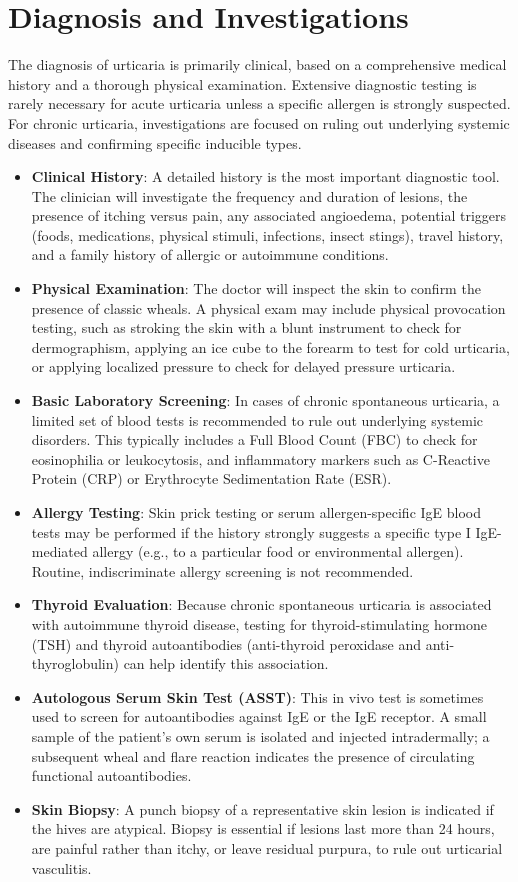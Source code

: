 \section*{Diagnosis and Investigations}
The diagnosis of urticaria is primarily clinical, based on a comprehensive medical history and a thorough physical examination. Extensive diagnostic testing is rarely necessary for acute urticaria unless a specific allergen is strongly suspected. For chronic urticaria, investigations are focused on ruling out underlying systemic diseases and confirming specific inducible types.

\begin{itemize}
    \item \textbf{Clinical History}: A detailed history is the most important diagnostic tool. The clinician will investigate the frequency and duration of lesions, the presence of itching versus pain, any associated angioedema, potential triggers (foods, medications, physical stimuli, infections, insect stings), travel history, and a family history of allergic or autoimmune conditions.
    \item \textbf{Physical Examination}: The doctor will inspect the skin to confirm the presence of classic wheals. A physical exam may include physical provocation testing, such as stroking the skin with a blunt instrument to check for dermographism, applying an ice cube to the forearm to test for cold urticaria, or applying localized pressure to check for delayed pressure urticaria.
    \item \textbf{Basic Laboratory Screening}: In cases of chronic spontaneous urticaria, a limited set of blood tests is recommended to rule out underlying systemic disorders. This typically includes a Full Blood Count (FBC) to check for eosinophilia or leukocytosis, and inflammatory markers such as C-Reactive Protein (CRP) or Erythrocyte Sedimentation Rate (ESR).
    \item \textbf{Allergy Testing}: Skin prick testing or serum allergen-specific IgE blood tests may be performed if the history strongly suggests a specific type I IgE-mediated allergy (e.g., to a particular food or environmental allergen). Routine, indiscriminate allergy screening is not recommended.
    \item \textbf{Thyroid Evaluation}: Because chronic spontaneous urticaria is associated with autoimmune thyroid disease, testing for thyroid-stimulating hormone (TSH) and thyroid autoantibodies (anti-thyroid peroxidase and anti-thyroglobulin) can help identify this association.
    \item \textbf{Autologous Serum Skin Test (ASST)}: This in vivo test is sometimes used to screen for autoantibodies against IgE or the IgE receptor. A small sample of the patient's own serum is isolated and injected intradermally; a subsequent wheal and flare reaction indicates the presence of circulating functional autoantibodies.
    \item \textbf{Skin Biopsy}: A punch biopsy of a representative skin lesion is indicated if the hives are atypical. Biopsy is essential if lesions last more than 24 hours, are painful rather than itchy, or leave residual purpura, to rule out urticarial vasculitis.
\end{itemize}

